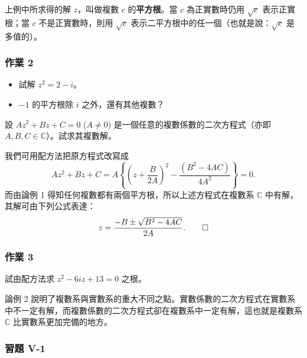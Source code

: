 上例中所求得的解 $z$，叫做複數 $c$ 的\textbf{平方根}。當 $c$ 為正實數時仍用 $\sqrt{c}$ 表示正實根；當 $c$ 不是正實數時，則用 $\sqrt{c}$ 表示二平方根中的任一個（也就是說：$\sqrt{c}$ 是多值的）。

\subsubsection*{作業 2}
\begin{itemize}
  \item[(i)] 試解 $z^2=2-i$。
  \item[(ii)] $-1$ 的平方根除 $i$ 之外，還有其他複數？
\end{itemize}


\begin{discussion}
設 $Az^2+Bz+C=0$ ($A\neq 0$) 是一個任意的複數係數的二次方程式（亦即 $A, B, C \in \mathbb{C}$）。試求其複數解。
\end{discussion}

\begin{solution}
我們可用配方法把原方程式改寫成
\[
Az^2+Bz+C = A\left\{\left(z+\frac{B}{2A}\right)^2 - \frac{(B^2-4AC)}{4A^2}\right\} = 0.
\]
而由論例 1 得知任何複數都有兩個平方根，所以上述方程式在複數系 $\mathbb{C}$ 中有解，其解可由下列公式表達：
\[
z = \frac{-B \pm \sqrt{B^2-4AC}}{2A}. \qedhere
\]
\end{solution}

\subsubsection*{作業 3}
試由配方法求 $z^2-6iz+13=0$ 之根。


論例 2 說明了複數系與實數系的重大不同之點。實數係數的二次方程式在實數系中不一定有解，而複數係數的二次方程式卻在複數系中一定有解，這也就是複數系 $\mathbb{C}$ 比實數系更加完備的地方。

\subsubsection*{習題 V-1}

